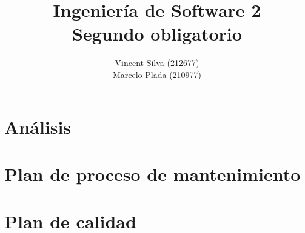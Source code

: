 

%

\title{Ingeniería de Software 2\\Segundo obligatorio}
\author{Vincent Silva (212677) \\Marcelo Plada (210977) \\}




\maketitle

\tableofcontents

\chapter{Análisis}


\newpage


\newpage


\newpage
\chapter{Plan de proceso de mantenimiento}
    
    \newpage
    
    \newpage
    
    \newpage
    
    \newpage
    
    \newpage
    
    \newpage
    
    \newpage
        
    \newpage
        
    \newpage
    
    \newpage
    
    \newpage
    
    \newpage
    
    \newpage
\chapter{Plan de calidad}
    


